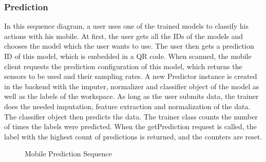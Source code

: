\subsubsection{Prediction}
In this sequence diagram, a user uses one of the trained models to classify his actions with his mobile. At first, the user gets all the IDs of the models and chooses the model which the user wants to use. The user then gets a prediction ID of this model, which is embedded in a QR code. When scanned, the mobile client requests the prediction configuration of this model, which returns the sensors to be used and their sampling rates. A new Predictor instance is created in the backend with the imputer, normalizer and classifier object of the model as well as the labels of the workspace. As long as the user submits data, the trainer does the needed imputation, feature extraction and normalization of the data. The classifier object then predicts the data. The trainer class counts the number of times the labels were predicted. When the getPrediction request is called, the label with the highest count of predictions is returned, and the counters are reset.
\begin{figure}[!htb]
    \centering
    \caption{Mobile Prediction Sequence}
    \label{fig:seq-predict}
\end{figure}